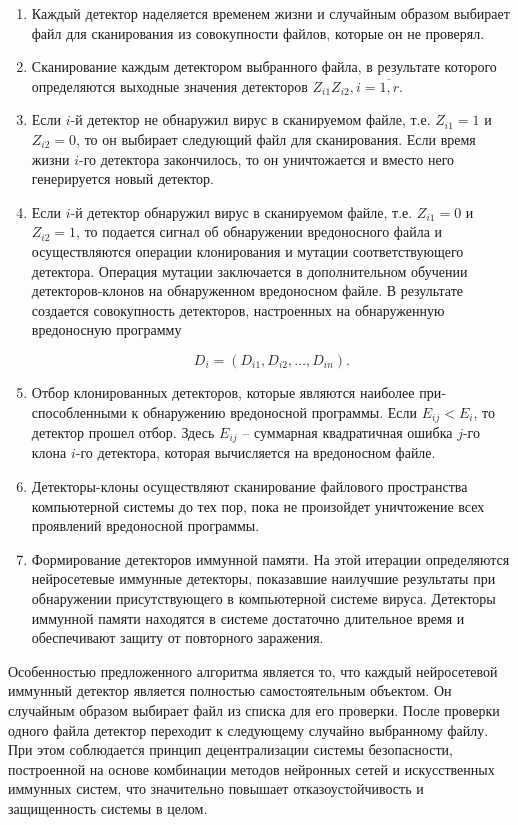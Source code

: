 \documentclass[bachelor, och, referat]{template}
\begin{document}
\begin{enumerate}
    \item Каждый детектор наделяется временем жизни и случайным образом
    выбирает файл для сканирования из совокупности файлов, которые он не
    проверял.
    \item Сканирование каждым детектором выбранного файла, в результате
    которого определяются выходные значения детекторов $Z_{i1} Z_{i2}, i = \overline{1, r}$.
    \item Если $i$-й детектор не обнаружил вирус в сканируемом файле, т.е.
    $Z_{i1} = 1$ и $Z_{i2} = 0$, то он выбирает следующий файл для сканирования. Если
    время жизни $i$-го детектора закончилось, то он уничтожается и вместо
    него генерируется новый детектор.
    \item Если $i$-й детектор обнаружил вирус в сканируемом файле, т.е. $Z_{i1} = 0$
    и $Z_{i2} = 1$, то подается сигнал об обнаружении вредоносного файла и осуществляются 
    операции клонирования и мутации соответствующего детектора. 
    Операция мутации заключается в дополнительном обучении детекто­ров-клонов 
    на обнаруженном вредоносном файле. В результате создается
    совокупность детекторов, настроенных на обнаруженную вредоносную
    программу
    
    \begin{equation*}
        D_i = (D_{i1}, D_{i2}, \dots, D_{in}).
    \end{equation*}

    \item Отбор клонированных детекторов, которые являются наиболее при­
    способленными к обнаружению вредоносной программы. Если $E_{ij} < E_i$, то
    детектор прошел отбор. Здесь $E_{ij}$ -- суммарная квадратичная ошибка $j$-го
    клона $i$-го детектора, которая вычисляется на вредоносном файле.
    \item Детекторы-клоны осуществляют сканирование файлового про­странства 
    компьютерной системы до тех пор, пока не произойдет уничто­жение 
    всех проявлений вредоносной программы.
    \item Формирование детекторов иммунной памяти. На этой итерации
    определяются нейросетевые иммунные детекторы, показавшие наилучшие 
    результаты при обнаружении присутствующего в компьютерной системе вируса. 
    Детекторы иммунной памяти находятся в системе достаточ­но 
    длительное время и обеспечивают защиту от повторного заражения.
\end{enumerate}
    
Особенностью предложенного алгоритма является то, что каждый
нейросетевой иммунный детектор является полностью самостоятельным
объектом. Он случайным образом выбирает файл из списка для его проверки. 
После проверки одного файла детектор переходит к следующему
случайно выбранному файлу. При этом соблюдается принцип децентрализации 
системы безопасности, построенной на основе комбинации мето­дов 
нейронных сетей и искусственных иммунных систем, что значительно
повышает отказоустойчивость и защищенность системы в целом.
\end{document}
